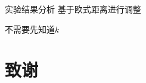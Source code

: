 \documentclass[14pt]{beamer}
\begin{document}
\begin{frame}{实验结果分析}
基于欧式距离进行调整 \pause

不需要先知道$k$
\end{frame}





\section{致谢}

\end{document}
